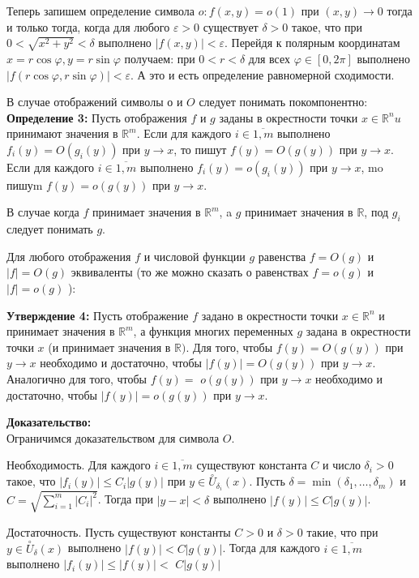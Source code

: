 \documentclass[a4paper,12pt]{article} %
\begin{document}
Теперь запишем определение символа $o: f(x, y)=o(1)$ при $(x, y) \rightarrow 0$ тогда и только тогда, когда для любого $\varepsilon>0$ существует $\delta>0$ такое, что при $0<\sqrt{x^{2}+y^{2}}<\delta$ выполнено $|f(x, y)|<\varepsilon$. Перейдя к полярным координатам $x=r \cos \varphi, y=r \sin \varphi$ получаем: при $0<r<\delta$ для всех $\varphi \in[0,2 \pi]$ выполнено $|f(r \cos \varphi, r \sin \varphi)|<\varepsilon$. А это и есть определение равномерной сходимости.

В случае отображений символы $о$ и $O$ следует понимать покомпонентно:\\ \textbf{Определение 3:} Пусть отображения $f$ и $g$ заданы в окрестности точки $x \in \mathbb{R}^{n} u$ принимают значения в $\mathbb{R}^{m}$. Если для каждого $i \in \overline{1, m}$ выполнено $f_{i}(y)=O\left(g_{i}(y)\right)$ при $y \rightarrow x$, то пишут $f(y)=O(g(y))$ при $y \rightarrow x$. Если для каждого $i \in \overline{1, m}$ выполнено $f_{i}(y)=o\left(g_{i}(y)\right)$ при $y \rightarrow x$, mo пишуm $f(y)=o(g(y))$ при $y \rightarrow x$.

В случае когда $f$ принимает значения в $\mathbb{R}^{m}$, a $g$ принимает значения в $\mathbb{R}$, под $g_{i}$ следует понимать $g$.

Для любого отображения $f$ и числовой функции $g$ равенства $f=O(g)$ и $|f|=O(g)$ эквиваленты (то же можно сказать о равенствах $f=o(g)$ и $|f|=o(g)$ ):

\textbf{Утверждение 4:} Пусть отображение $f$ задано в окрестности точки $x \in \mathbb{R}^{n}$ и принимает значения в $\mathbb{R}^{m}$, а функция многих переменных $g$ задана в окрестности точки $x$ (и принимает значения в $\mathbb{R})$. Для того, чтобы $f(y)=O(g(y))$ при $y \rightarrow x$ необходимо и достаточно, чтобы $|f(y)|=O(g(y))$ при $y \rightarrow x$. Аналогично для того, чтобы $f(y)=$ $o(g(y))$ при $y \rightarrow x$ необходимо и достаточно, чтобы $|f(y)|=o(g(y))$ при $y \rightarrow x$.

\textbf{Доказательство:}\\
Ограничимся доказательством для символа $O$.

Необходимость. Для каждого $i \in \overline{1, m}$ существуют константа $C$ и число $\delta_{i}>0$ такое, что $\left|f_{i}(y)\right| \leq C_{i}|g(y)|$ при $y \in \stackrel{\circ}{U}_{\delta_{i}}(x)$. Пусть $\delta=\min \left(\delta_{1}, \ldots, \delta_{m}\right)$ и $C=\sqrt{\sum_{i=1}^{m}\left|C_{i}\right|^{2}}$. Тогда при $|y-x|<\delta$ выполнено $|f(y)| \leq C|g(y)|$.

Достаточность. Пусть существуют константы $C>0$ и $\delta>0$ такие, что при $y \in \stackrel{\circ}{U}_{\delta}(x)$ выполнено $|f(y)|<C|g(y)|$. Тогда для каждого $i \in \overline{1, m}$ выполнено $\left|f_{i}(y)\right| \leq|f(y)|<$ $C|g(y)|$
\end{document}
